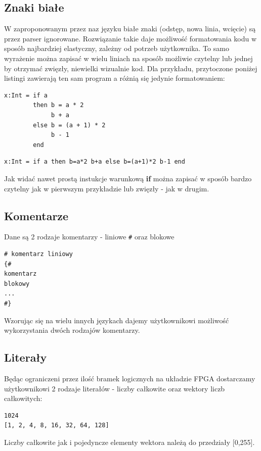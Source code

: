 \subsection{Znaki białe}
W zaproponowanym przez naz języku białe znaki (odstęp, nowa linia, wcięcie) są przez parser ignorowane.
Rozwiązanie takie daje możliwość formatowania kodu w sposób najbardziej elastyczny, zależny od potrzeb użytkownika. To samo wyrażenie można zapisać w wielu liniach na sposób możliwie czytelny lub jednej by otrzymać zwięzły, niewielki wizualnie kod.
Dla przykładu, przytoczone poniżej listingi zawierają ten sam program a różnią się jedynie formatowaniem:\\
\begin{lstlisting}[frame=single]
x:Int = if a
        then b = a * 2
             b + a
        else b = (a + 1) * 2
             b - 1
        end
\end{lstlisting}
\begin{lstlisting}[frame=single]
x:Int = if a then b=a*2 b+a else b=(a+1)*2 b-1 end
\end{lstlisting}
Jak widać nawet prostą instukcje warunkową \textbf{if} można zapisać w sposób bardzo czytelny jak w pierwszym przykładzie lub zwięzły - jak w drugim.
\subsection{Komentarze}
Dane są 2 rodzaje komentarzy - liniowe \texttt{\#} oraz blokowe \texttt{}\\
\begin{lstlisting}[frame=single]
# komentarz liniowy
{#
komentarz
blokowy
...
#}
\end{lstlisting}
Wzorując się na wielu innych językach dajemy użytkownikowi możliwość wykorzystania dwóch rodzajów komentarzy.
\subsection{Literały}
Będąc ograniczeni przez ilość bramek logicznych na układzie FPGA dostarczamy użytkownikowi 2 rodzaje literałów - liczby całkowite oraz wektory liczb całkowitych:\\
\begin{lstlisting}[frame=single]
1024
[1, 2, 4, 8, 16, 32, 64, 128]
\end{lstlisting}
Liczby całkowite jak i pojedyncze elementy wektora należą do przedziały [0,255].
